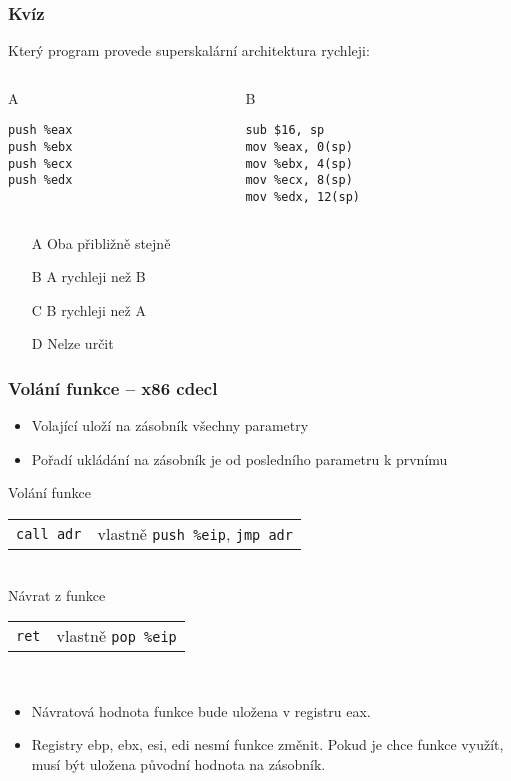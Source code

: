 \documentclass{beamer}
\begin{document}
\begin{frame}[fragile]
\frametitle{Kvíz}

Který program provede superskalární architektura rychleji:
\begin{columns}
\begin{column}{0.45\textwidth}
A
\begin{verbatim}
push %eax
push %ebx
push %ecx
push %edx
\end{verbatim}
\end{column}
\hfill
\begin{column}{0.45\textwidth}  
B
\begin{verbatim}
sub $16, sp
mov %eax, 0(sp)
mov %ebx, 4(sp)
mov %ecx, 8(sp)
mov %edx, 12(sp)
\end{verbatim}
\end{column}
\end{columns}

\begin{itemize}
\item[A] Oba přibližně stejně
\item[B] A rychleji než B
\item[C] B rychleji než A
\item[D] Nelze určit
\end{itemize}
\end{frame}

\begin{frame}
\frametitle{Volání funkce -- x86 cdecl}

\begin{itemize}
\item Volající uloží na zásobník všechny parametry
\item Pořadí ukládání na zásobník je od posledního parametru k prvnímu
\end{itemize}

\bigskip

Volání funkce\\
\begin{tabular}{ l l}
\texttt{call adr} &         vlastně \texttt{push \%eip}, \texttt{jmp adr}\\
\end{tabular}\\
Návrat z funkce\\
\begin{tabular}{ l l}
\texttt{ret} &              vlastně \texttt{pop \%eip}\\
\end{tabular}\\
\bigskip

\begin{itemize}
\item Návratová hodnota funkce bude uložena v registru eax.
\item Registry ebp, ebx, esi, edi nesmí funkce změnit. Pokud je chce funkce využít, musí být uložena původní hodnota na zásobník.
\end{itemize}

\end{frame}
\end{document}
